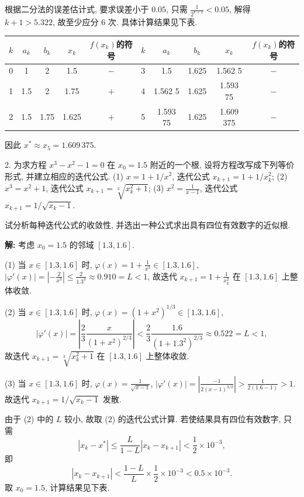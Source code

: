 \documentclass[a4paper,11pt]{ctexart}
\begin{document}
根据二分法的误差估计式, 要求误差小于 $0.05$, 只需 $\frac{1}{2^{k+1}} < 0.05$, 解得 $k+1 > 5.322$, 故至少应分 6 次. 具体计算结果见下表.

\begin{table}[h]
\centering
\begin{tabular}{c|c|c|c|c|c|c|c|c|c}
\toprule
$k$ & $a_k$ & $b_k$ & $x_k$ & $f(x_k)$的符号 & $k$ & $a_k$ & $b_k$ & $x_k$ & $f(x_k)$的符号 \\
\midrule
0 & 1 & 2 & 1.5 & $-$ & 3 & 1.5 & 1.625 & 1.562 5 & $-$ \\
1 & 1.5 & 2 & 1.75 & $+$ & 4 & 1.562 5 & 1.625 & 1.593 75 & $-$ \\
2 & 1.5 & 1.75 & 1.625 & $+$ & 5 & 1.593 75 & 1.625 & 1.609 375 & $-$ \\
\bottomrule
\end{tabular}
\end{table}

因此 $x^* \approx x_5 = 1.609\,375$.

\vspace{2em}

2. 为求方程 $x^3 - x^2 - 1 = 0$ 在 $x_0 = 1.5$ 附近的一个根, 设将方程改写成下列等价形式, 并建立相应的迭代公式.
(1) $x = 1 + 1/x^2$, 迭代公式 $x_{k+1} = 1 + 1/x_k^2$;
(2) $x^3 = x^2 + 1$, 迭代公式 $x_{k+1} = \sqrt[3]{x_k^2 + 1}$;
(3) $x^2 = \frac{1}{x-1}$, 迭代公式 $x_{k+1} = 1/\sqrt{x_k - 1}$.

试分析每种迭代公式的收敛性, 并选出一种公式求出具有四位有效数字的近似根.

\textbf{解: } 考虑 $x_0 = 1.5$ 的邻域 $[1.3, 1.6]$.

(1) 当 $x \in [1.3, 1.6]$ 时, $\varphi(x) = 1 + \frac{1}{x^2} \in [1.3, 1.6]$, $|\varphi'(x)| = \left| -\frac{2}{x^3} \right| \leqslant \frac{2}{1.3^3} \approx 0.910 = L < 1$, 故迭代 $x_{k+1} = 1 + \frac{1}{x_k^2}$ 在 $[1.3, 1.6]$ 上整体收敛.

(2) 当 $x \in [1.3, 1.6]$ 时, $\varphi(x) = (1 + x^2)^{1/3} \in [1.3, 1.6]$,
\[
|\varphi'(x)| = \left| \frac{2}{3} \frac{x}{(1+x^2)^{2/3}} \right| < \frac{2}{3} \frac{1.6}{(1+1.3^2)^{2/3}} \approx 0.522 = L < 1,
\]
故迭代 $x_{k+1} = \sqrt[3]{x_k^2+1}$ 在 $[1.3, 1.6]$ 上整体收敛.

(3) 当 $x \in [1.3, 1.6]$ 时, $\varphi(x) = \frac{1}{\sqrt{x-1}}$, $|\varphi'(x)| = \left| \frac{-1}{2(x-1)^{3/2}} \right| > \frac{1}{2(1.6-1)} > 1$.
故迭代 $x_{k+1} = 1/\sqrt{x_k-1}$ 发散.

由于 (2) 中的 $L$ 较小, 故取 (2) 的迭代公式计算. 若使结果具有四位有效数字, 只需
\[
|x_k - x^*| \leqslant \frac{L}{1-L} |x_k - x_{k+1}| < \frac{1}{2} \times 10^{-3},
\]
即
\[
|x_k - x_{k+1}| < \frac{1-L}{L} \times \frac{1}{2} \times 10^{-3} < 0.5 \times 10^{-3}.
\]
取 $x_0 = 1.5$, 计算结果见下表.
\end{document}
